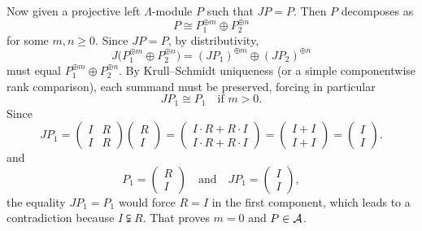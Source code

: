 \documentclass[a4paper,10pt, oneside]{amsart}
\begin{document}
\begin{exam}
		Now given a projective left $\Lambda$-module $P$ such that $JP = P$. Then $P$ decomposes as
		\[
		P \cong P_1^{\oplus m} \oplus P_2^{\oplus n}
		\]
		for some $m,n \geq 0$. Since $JP = P$,  by distributivity,
		\[
		J\big(P_1^{\oplus m} \oplus P_2^{\oplus n}\big) 
		= (J P_1)^{\oplus m} \oplus (J P_2)^{\oplus n}
		\]
		must equal $P_1^{\oplus m} \oplus P_2^{\oplus n}$. By Krull–Schmidt uniqueness (or a simple componentwise rank comparison), each summand must be preserved, forcing in particular
		\[
		J P_1 \cong P_1 \quad \text{if } m>0.
		\]
		Since
		\[
		J P_1
		=
		\begin{pmatrix} I & R \\ I & R \end{pmatrix}
		\begin{pmatrix} R \\ I \end{pmatrix}
		=
		\begin{pmatrix} I\cdot R + R\cdot I \\ I\cdot R + R\cdot I \end{pmatrix}
		=
		\begin{pmatrix} I + I \\ I + I \end{pmatrix}
		=
		\begin{pmatrix} I \\ I \end{pmatrix}.
		\]
		and
		\[
		P_1=\begin{pmatrix} R \\ I \end{pmatrix}
		\quad \text{and} \quad
		J P_1=\begin{pmatrix} I \\ I \end{pmatrix},
		\]
		the equality $J P_1 = P_1$ would force $R = I$ in the first component, which leads to a contradiction because $I \subsetneqq R$. That proves $m=0$ and $P\in\mathcal{A}$.
		

\end{exam}
\end{document}
